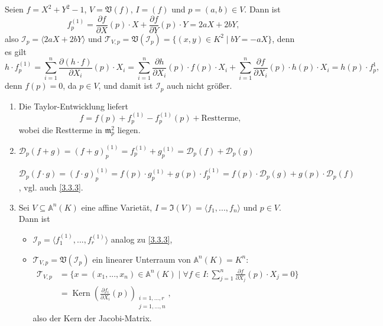\documentclass[a4paper,12pt,index=toc]{scrbook}
\theoremstyle{keinenummern} %
\def\A{\mathbb{A}}
\def\V{\mathfrak{V}}
\def\I{\mathfrak{I}}
\def\II{\mathcal{I}}
\newcommand{\DD}{\mathcal{D}} %
\def\T{\mathcal{T}}
\def\m{\mathfrak{m}}
\newcommand{\Kern}{\operatorname{Kern}}
\let\olddotsc\dotsc %
\renewcommand{\dotsc}{\ensuremath{\!...}}
\begin{document}
\begin{bsp}\label{3.3.3}
Seien $f=X^{2}+Y^{2}-1$, $V=\V(f)$, $I=(f)$ und $p=(a,b)\in V$.
Dann ist
\[f_{p}^{(1)}=\frac{\partial f}{\partial X}(p)\cdot X+\frac{\partial f}{\partial Y}(p)\cdot Y=2aX + 2bY,\]
also $\II_{p}=\langle 2aX+2bY \rangle$ und $\T_{V,p}=\V(\II_{p})=\{(x,y)\in K^{2}\mid bY=-aX\}$, denn es gilt
\[h\cdot f_{p}^{(1)}=\sum_{i=1}^{n}\frac{\partial(h\cdot f)}{\partial X_{i}}(p)\cdot X_{i}=\sum_{i=1}^{n}\frac{\partial h}{\partial X_{i}}(p)\cdot f(p)\cdot X_{i}+\sum_{i=1}^{n}\frac{\partial f}{\partial X_{i}}(p)\cdot h(p)\cdot X_{i}=h(p)\cdot f_{p}^{1},\]
denn $f(p)=0$, da $p\in V$, und damit ist $\II_{p}$ auch nicht größer.
\end{bsp}

\begin{bem}\label{3.3.4}
\begin{enumerate}
\item{} Die Taylor-Entwicklung liefert
\[f=f(p)+f_{p}^{(1)}-f_{p}^{(1)}(p)+\text{Restterme},\]
wobei die Restterme in $\m_{p}^{2}$ liegen.
\item{} $\DD_{p}(f+g)=(f+g)_{p}^{(1)}=f_{p}^{(1)}+g_{p}^{(1)}=\DD_{p}(f)+\DD_{p}(g)$

$\DD_{p}(f\cdot g)=(f\cdot g)_{p}^{(1)}=f(p)\cdot g_{p}^{(1)}+g(p)\cdot f_{p}^{(1)}=f(p)\cdot \DD_{p}(g)+g(p)\cdot\DD_{p}(f)$, vgl. auch \cref{3.3.3}.
\item{} Sei $V\subseteq\A^{n}(K)$ eine affine Varietät, $I=\I(V)=\langle f_{1},\dotsc,f_{n}\rangle$ und $p\in V$. Dann ist
\begin{itemize}
\item $\II_{p}=\langle f_{1}^{(1)},\dotsc,f_{r}^{(1)}\rangle$ analog zu \cref{3.3.3},
\item $\T_{V,p}=\V(\II_{p})$ ein linearer Unterraum von $\A^{n}(K)=K^{n}$:
\begin{align*}\T_{V,p}&=\{x=(x_{1},\dotsc,x_{n})\in\A^{n}(K)\mid \forall f\in I:\sum_{j=1}^{n}\frac{\partial f}{\partial X_{j}}(p)\cdot X_{j}=0\}\\
&=\Kern\left(\frac{\partial f_{i}}{\partial X_{i}}(p)\right)_{\substack{i=1,\olddotsc,r\\ j=1,\olddotsc,n}},\end{align*}
also der Kern der Jacobi-Matrix.
\end{itemize}
\end{enumerate}\end{bem}
\end{document}
